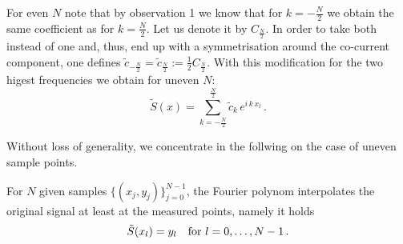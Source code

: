 \documentclass[a4paper, 10pt]{article}
\begin{document}
{For even $N$ note that by observation 1 we know that for  $k=-\frac{N}{2}$ we obtain the same coefficient as for $k={\frac{N}{2}}$. Let us denote it by $C_{\frac{N}{2}}$. In order to take both instead of one and, thus, end up with a symmetrisation around the co-current component, one defines $\tilde c_{-\frac{N}{2}} = \tilde c_{\frac{N}{2}} := \frac12 C_{\frac{N}{2}}$. With this modification for the two higest frequencies we obtain for uneven $N$:
\begin{equation*}
\tilde S(x) = \sum\limits_{k=-\frac{N}{2}}^{\frac{N}{2}} \tilde c_k \, e^{i\,k\,x_l} \,.
\end{equation*}

Without loss of generality, we concentrate in the follwing on the case of uneven sample points.

\vspace{0.5cm}


 For $N$ given samples $\{ (x_j, y_j)\}_{j=0}^{N-1}$, the Fourier polynom interpolates the original signal at least at the measured points, namely it holds
\begin{equation}\label{InterpolationProperty}
\tilde S(x_l) = y_l\quad \textnormal{for } l=0, \dots, N-1\,.
\end{equation}

}
\end{document}
